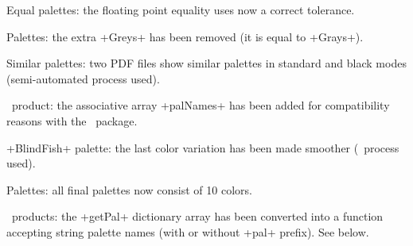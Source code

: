 \documentclass{tutodoc}
\begin{document}
\tdocsep

\begin{tdocfix}[version = 1.2.1, date = 2025-11-09]
    \item Equal palettes: the floating point equality uses now a correct tolerance.
\end{tdocfix}




\begin{tdocbreak}
    \item Palettes: the extra +Greys+ has been removed (it is equal to +Grays+).
\end{tdocbreak}




\begin{tdocnew}
    \item Similar palettes: two PDF files show similar palettes in standard and black modes (semi-automated process used).
\end{tdocnew}




\begin{tdocupdate}
    \item \LUADRAW\ product: the associative array +palNames+ has been added for compatibility reasons with the \LUADRAW\ package.


    \item {}+BlindFish+ palette: the last color variation has been made smoother (\LUADRAW\ process used).
\end{tdocupdate}

\tdocsep

\begin{tdocbreak}[version = 1.2.0, date = 2025-10-29]
    \item Palettes: all final palettes now consist of 10 colors.


    \item \LUADRAW\ products: the +getPal+ dictionary array has been converted into a function accepting string palette names (with or without +pal+ prefix). See below.
\end{tdocbreak}


\end{document}
